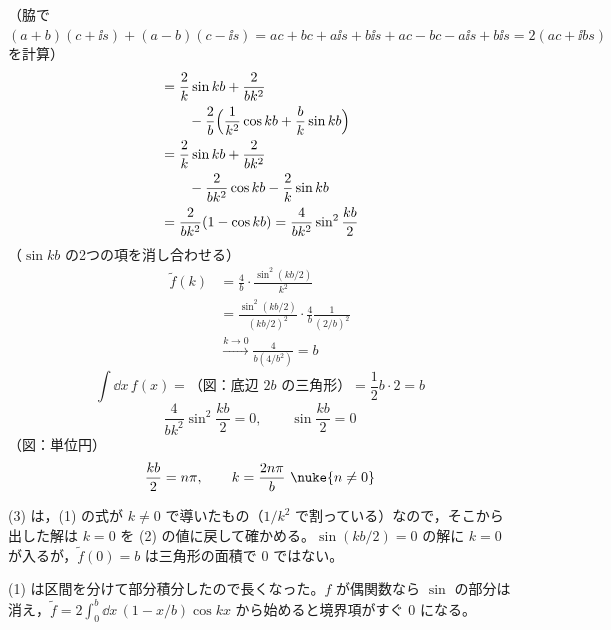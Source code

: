 （脇で $(a+b)(c+\ii s)+(a-b)(c-\ii s)=ac+bc+a\ii s+b\ii s+ac-bc-a\ii s+b\ii s=2(ac+\ii bs)$ を計算）
\begin{align*}
  &=\frac{2}{k}\sin kb+\frac{2}{bk^{2}}\\
  &\qquad-\frac{2}{b}\Bigl(\frac{1}{k^{2}}\cos kb+\frac{b}{k}\sin kb\Bigr)\\
  &=\frac{2}{k}\sin kb+\frac{2}{bk^{2}}\\
  &\qquad-\frac{2}{bk^{2}}\cos kb-\frac{2}{k}\sin kb\\
  &=\frac{2}{bk^{2}}(1-\cos kb)=\frac{4}{bk^{2}}\sin^{2}\frac{kb}{2}
\end{align*}
（$\sin kb$ の2つの項を消し合わせる）
\begin{align*}
  \tilde f(k)&=\frac{4}{b}\cdot\frac{\sin^{2}(kb/2)}{k^{2}}\\
  &=\frac{\sin^{2}(kb/2)}{(kb/2)^{2}}\cdot\frac{4}{b}\frac{1}{(2/b)^{2}}\\
  &\xrightarrow{k\to0}\frac{4}{b(4/b^{2})}=b
\end{align*}
\[ \int\dd x\,f(x)=\text{（図：底辺 $2b$ の三角形）}=\frac{1}{2}b\cdot2=b \]
\[ \frac{4}{bk^{2}}\sin^{2}\frac{kb}{2}=0,\qquad\sin\frac{kb}{2}=0 \]
（図：単位円）
\[ \frac{kb}{2}=n\pi,\qquad k=\frac{2n\pi}{b}\ \nuke{n\neq0} \]
\item (3) は，(1) の式が $k\neq0$ で導いたもの（$1/k^{2}$ で割っている）なので，そこから出した解は $k=0$ を (2) の値に戻して確かめる。$\sin(kb/2)=0$ の解に $k=0$ が入るが，$\tilde f(0)=b$ は三角形の面積で 0 ではない。
\item (1) は区間を分けて部分積分したので長くなった。$f$ が偶関数なら $\sin$ の部分は消え，$\tilde f=2\int_{0}^{b}\dd x\,(1-x/b)\cos kx$ から始めると境界項がすぐ 0 になる。
